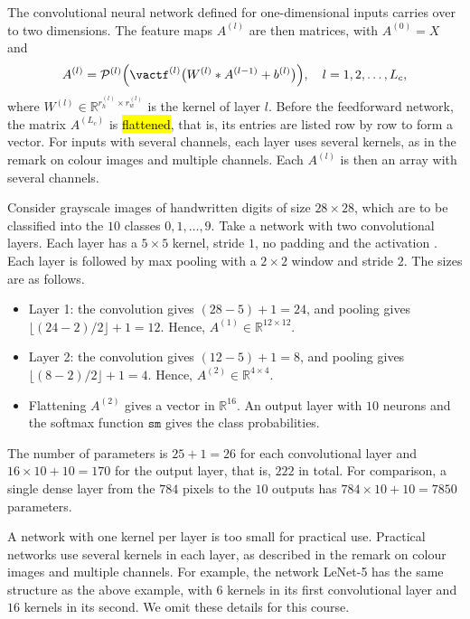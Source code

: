 \begin{remark}
The convolutional neural network defined for one-dimensional inputs carries over to two dimensions. The feature maps $A^{(l)}$ are then matrices, with $A^{(0)} = X$ and
$$
A^{(l)} = \mathcal{P}^{(l)}\Big(\vactf^{(l)}\big(W^{(l)} * A^{(l-1)} + b^{(l)}\big)\Big),
\quad l = 1, 2, \ldots, L_c,
$$
where $W^{(l)}\in\mathbb{R}^{r^{(l)}_h\times r^{(l)}_w}$ is the kernel of layer $l$. Before the feedforward network, the matrix $A^{(L_c)}$ is \hl{flattened}, that is, its entries are listed row by row to form a vector. For inputs with several channels, each layer uses several kernels, as in the remark on colour images and multiple channels. Each $A^{(l)}$ is then an array with several channels.
\end{remark}
\begin{example}
Consider grayscale images of handwritten digits of size $28\times28$, which are to be classified into the $10$ classes $0, 1, \ldots, 9$. Take a network with two convolutional layers. Each layer has a $5\times5$ kernel, stride $1$, no padding and the activation \ReLU. Each layer is followed by max pooling with a $2\times2$ window and stride $2$. The sizes are as follows.
\begin{itemize}
\item Layer 1: the convolution gives $(28-5)+1 = 24$, and pooling gives $\lfloor (24-2)/2\rfloor + 1 = 12$. Hence, $A^{(1)}\in\mathbb{R}^{12\times12}$.
\item Layer 2: the convolution gives $(12-5)+1 = 8$, and pooling gives $\lfloor (8-2)/2\rfloor + 1 = 4$. Hence, $A^{(2)}\in\mathbb{R}^{4\times4}$.
\item Flattening $A^{(2)}$ gives a vector in $\mathbb{R}^{16}$. An output layer with $10$ neurons and the softmax function $\texttt{sm}$ gives the class probabilities.
\end{itemize}
The number of parameters is $25+1 = 26$ for each convolutional layer and $16\times10 + 10 = 170$ for the output layer, that is, $222$ in total. For comparison, a single dense layer from the $784$ pixels to the $10$ outputs has $784\times10 + 10 = 7850$ parameters.
\end{example}
\begin{remark}
A network with one kernel per layer is too small for practical use. Practical networks use several kernels in each layer, as described in the remark on colour images and multiple channels. For example, the network LeNet-5  has the same structure as the above example, with $6$ kernels in its first convolutional layer and $16$ kernels in its second. We omit these details for this course.
\end{remark}
